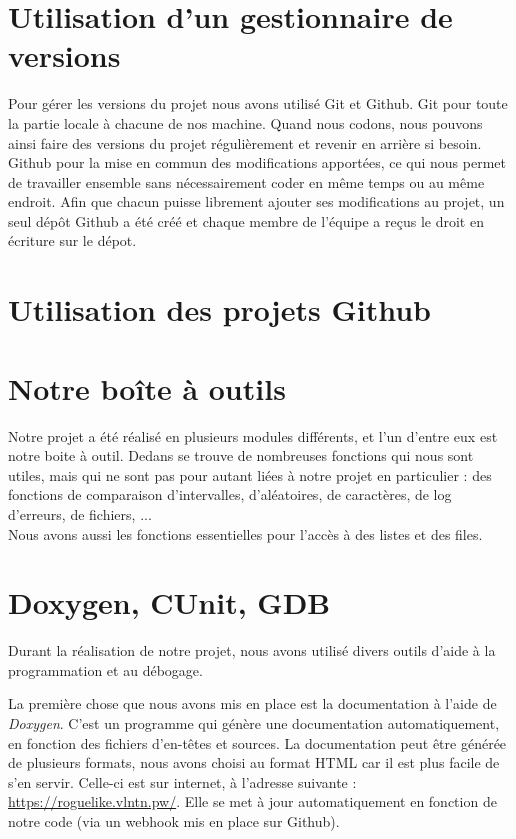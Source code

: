 \documentclass[12pt]{report}
\begin{document}
	\section{Utilisation d'un gestionnaire de versions}
	
		Pour gérer les versions du projet nous avons utilisé Git et Github. Git pour toute la partie locale à chacune de nos machine. Quand nous codons, nous pouvons ainsi faire des versions du projet régulièrement et revenir en arrière si besoin. Github pour la mise en commun des modifications apportées, ce qui nous permet de travailler ensemble sans nécessairement coder en même temps ou au même endroit. Afin que chacun puisse librement ajouter ses modifications au projet, un seul dépôt Github a été créé et chaque membre de l'équipe a reçus le droit en écriture sur le dépot.
	
	\section{Utilisation des projets Github}

	\section{Notre boîte à outils} 

		Notre projet a été réalisé en plusieurs modules différents, et l'un d'entre eux est notre boite à outil. Dedans se trouve de nombreuses fonctions qui nous sont utiles, mais qui ne sont pas pour autant liées à notre projet en particulier : des fonctions de comparaison d'intervalles, d'aléatoires, de caractères, de log d'erreurs, de fichiers, ...\\
		Nous avons aussi les fonctions essentielles pour l'accès à des listes et des files.

	\section{Doxygen, CUnit, GDB}
	
		Durant la réalisation de notre projet, nous avons utilisé divers outils d'aide à la programmation et au débogage. 
		
		\vspace{12pt}		
		
		La première chose que nous avons mis en place est la documentation à l'aide de \emph{Doxygen}. C'est un programme qui génère une documentation automatiquement, en fonction des fichiers d'en-têtes et sources. La documentation peut être générée de plusieurs formats, nous avons choisi au format HTML car il est plus facile de s'en servir. Celle-ci est sur internet, à l'adresse suivante : \url{https://roguelike.vlntn.pw/}. Elle se met à jour automatiquement en fonction de notre code (via un webhook mis en place sur Github).
		
\end{document}
